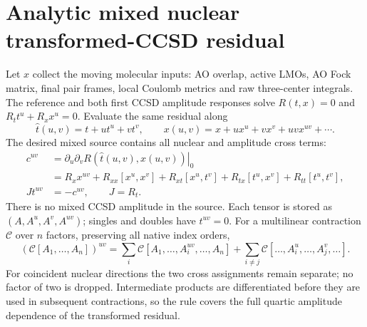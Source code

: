 \documentclass[11pt]{article}
\begin{document}
\section{Analytic mixed nuclear transformed-CCSD residual}
Let $x$ collect the moving molecular inputs: AO overlap, active LMOs, AO
Fock matrix, final pair frames, local Coulomb metrics and raw three-center
integrals. The reference and both first CCSD amplitude responses solve
$R(t,x)=0$ and $R_t t^u+R_x x^u=0$. Evaluate the same residual along
\begin{equation}
 \widehat t(u,v)=t+u t^u+v t^v,\qquad
 x(u,v)=x+u x^u+v x^v+uv x^{uv}+\cdots .
\end{equation}
The desired mixed source contains all nuclear and amplitude cross terms:
\begin{align}
 c^{uv}&=\left.\partial_u\partial_v
                   R(\widehat t(u,v),x(u,v))\right|_0\\
 &=R_x x^{uv}+R_{xx}[x^u,x^v]+R_{xt}[x^u,t^v]
       +R_{tx}[t^u,x^v]+R_{tt}[t^u,t^v],\\
 Jt^{uv}&=-c^{uv},\qquad J=R_t.
\end{align}
There is no mixed CCSD amplitude in the source. Each tensor is stored as
$(A,A^u,A^v,A^{uv})$; singles and doubles have $t^{uv}=0$. For a multilinear
contraction $\mathcal C$ over $n$ factors, preserving all native index orders,
\begin{equation}
 (\mathcal C[A_1,\ldots,A_n])^{uv}
 =\sum_i\mathcal C[A_1,\ldots,A_i^{uv},\ldots,A_n]
 +\sum_{i\ne j}\mathcal C[\ldots,A_i^u,\ldots,A_j^v,\ldots].
\end{equation}
For coincident nuclear directions the two cross assignments remain separate;
no factor of two is dropped. Intermediate products are differentiated before
they are used in subsequent contractions, so the rule covers the full
quartic amplitude dependence of the transformed residual.
\end{document}
